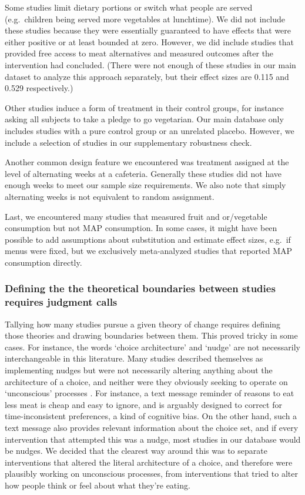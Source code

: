 \documentclass[sn-nature,referee,pdflatex]{sn-jnl}
\begin{document}
Some studies limit dietary portions or switch what people are served
(e.g.~children being served more vegetables at lunchtime). We did not
include these studies because they were essentially guaranteed to have
effects that were either positive or at least bounded at zero. However,
we did include studies that provided free access to meat alternatives
\citep{acharya2004, bianchi2022} and measured outcomes after the
intervention had concluded. (There were not enough of these studies in
our main dataset to analyze this approach separately, but their effect
sizes are 0.115 and 0.529 respectively.)

Other studies induce a form of treatment in their control groups, for
instance asking all subjects to take a pledge to go vegetarian. Our main
database only includes studies with a pure control group or an unrelated
placebo. However, we include a selection of studies in our supplementary
robustness check.

Another common design feature we encountered was treatment assigned at
the level of alternating weeks at a cafeteria. Generally these studies
did not have enough weeks to meet our sample size requirements. We also
note that simply alternating weeks is not equivalent to random
assignment.

Last, we encountered many studies that measured fruit and or/vegetable
consumption but not MAP consumption. In some cases, it might have been
possible to add assumptions about substitution and estimate effect
sizes, e.g.~if menus were fixed, but we exclusively meta-analyzed
studies that reported MAP consumption directly.

\subsubsection{Defining the the theoretical boundaries between studies
requires judgment calls}\label{sec5.4.4}

Tallying how many studies pursue a given theory of change requires
defining those theories and drawing boundaries between them. This proved
tricky in some cases. For instance, the words `choice architecture' and
`nudge' \citep{thaler2009} are not necessarily interchangeable in this
literature. Many studies described themselves as implementing nudges but
were not necessarily altering anything about the architecture of a
choice, and neither were they obviously seeking to operate on
`unconscious' processes \citep{garnett2020}. For instance, a text
message reminder of reasons to eat less meat is cheap and easy to
ignore, and is arguably designed to correct for time-inconsistent
preferences, a kind of cognitive bias. On the other hand, such a text
message also provides relevant information about the choice set, and if
every intervention that attempted this was a nudge, most studies in our
database would be nudges. We decided that the clearest way around this
was to separate interventions that altered the literal architecture of a
choice, and therefore were plausibly working on unconscious processes,
from interventions that tried to alter how people think or feel about
what they're eating.
\end{document}
